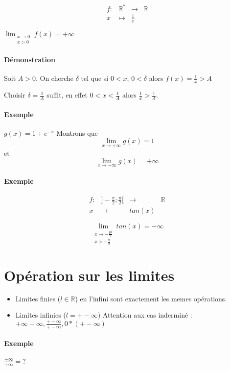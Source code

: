 \begin{align*}
	f:& \mathbb{R}^* &\rightarrow & \mathbb{R} \\
	x&\mapsto& \frac{1}{x}
\end{align*}

$\lim_{\substack{x \to 0 \\ x > 0}} f(x) = +\infty$
\paragraph{Démonstration} Soit $A>0$. On cherche $\delta$ tel que si $0<x$, $0<\delta$ alors $f(x) = \frac{1}{x} > A$

Choisir $\delta = \frac{1}{A}$ suffit, en effet $0<x<\frac{1}{A}$ alors $\frac{1}{x} > \frac{1}{A}$.

\paragraph{Exemple}
$g(x) = 1+e^{-x}$ Montrons que \[\lim_{x \to +\infty} g(x) = 1\] et \[\lim_{x \to -\infty}g(x) = +\infty\]

\paragraph{Exemple}
\begin{align*}
f:& ]-\frac{\pi}{2}; \frac{\pi}{2}[ &\rightarrow & \mathbb{R} \\
	x&\rightarrow& tan(x)
\end{align*}

\[\lim_{\substack{x \to -\frac{pi}{2} \\  x > - \frac{\pi}{2}}} tan(x) = -\infty\]

\section{Opération sur les limites}
\begin{itemize}
	\item[] Limites finies ($l\in \mathbb{R}$) en l'infini sont exactement les memes opérations.
	\item[] Limites infinies ($l = +- \infty$) Attention aux cas inderminé :
		$+\infty - \infty, \frac{+- \infty}{+-\infty}, 0*(+-\infty)$
\end{itemize}

\paragraph{Exemple} $\frac{+\infty}{+\infty} = ?$

